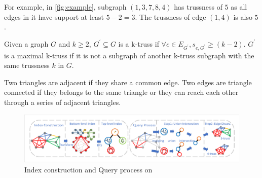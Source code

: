 For example, in \autoref{fig:example}, subgraph $(1,3,7,8,4)$ has trussness of $5$ as all edges in it have support at least $5-2=3$. The trussness of edge $(1,4)$ is also $5$.

\begin{Def}[k-truss]
Given a graph $G$ and $k \ge 2$, $G^{\prime} \subseteq G$ is a k-truss if $\forall e \in E_{G^{\prime}}, s_{e,G^{\prime}} \ge (k - 2)$. 
$G^{\prime}$ is a maximal k-truss if it is not a subgraph of another k-truss subgraph with the same trussness $k$ in $G$.
\label{def:k-truss}
\end{Def}


Two triangles are adjacent if they share a common edge. Two edges are triangle connected if they belongs to the same triangle or they can reach each other through a series of adjacent triangles. %
%


\begin{figure}[ht]
    \centering
    \includegraphics[width=0.9\linewidth, trim={0.6cm 0.6cm, 0.6cm, 0.6cm}, clip]{./figures/flow.pdf}
		\vspace{-0.2cm}
    \caption{Index construction and Query process on \twolevelindex{}}
    \label{fig:flow}
		\vspace{-0.5cm}
\end{figure}

